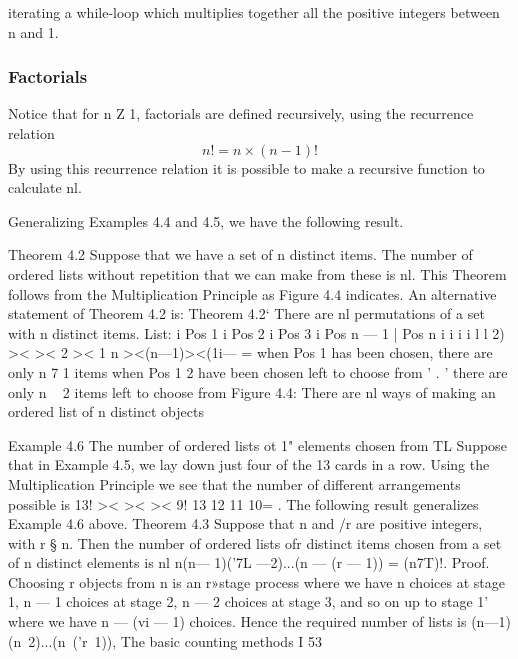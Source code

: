 \documentclass{beamer}
\begin{document}
\begin{frame}
\begin{frame}
iterating a while-loop which multiplies together all the positive
integers between n and 1.

\end{frame}
\begin{frame}
\frametitle{Factorials}
Notice that for n Z 1, factorials are deﬁned recursively, using the
recurrence relation
\[n! = n \times (n-1)! \] 
By using this recurrence relation it is possible to make a recursive
function to calculate nl.

Generalizing Examples 4.4 and 4.5, we have the following result.
\end{frame}
\begin{frame}
Theorem 4.2 Suppose that we have a set of n distinct items. The number
of ordered lists without repetition that we can make from these is nl.
This Theorem follows from the Multiplication Principle as Figure 4.4
indicates. An alternative statement of Theorem 4.2 is:
Theorem 4.2‘ There are nl permutations of a set with n distinct items.
List: i Pos 1 i Pos 2 i Pos 3 i Pos n — 1 | Pos n i
i i i l l
2) >< >< 2 >< 1
n ><(n—1)><(1i— =
when Pos 1 has been chosen,
there are only n 7 1 items when Pos 1 2 have been chosen
left to choose from ’ . ’
there are only n ~ 2 items
left to choose from
Figure 4.4: There are nl ways of making an ordered list of n distinct objects
\end{frame}
\begin{frame}
Example 4.6 The number of ordered lists ot 1" elements chosen from TL
Suppose that in Example 4.5, we lay down just four of the 13 cards
in a row. Using the Multiplication Principle we see that the number
of different arrangements possible is
13!
>< >< >< 9!
13 12 11 10= .
The following result generalizes Example 4.6 above.
Theorem 4.3 Suppose that n and /r are positive integers, with r § n.
Then the number of ordered lists ofr distinct items chosen from a set of
n distinct elements is
nl
n(n— 1)('7L —2)...(n — (r — 1)) = (n7T)!.
Proof. Choosing r objects from n is an r»stage process where we
have n choices at stage 1, n — 1 choices at stage 2, n — 2 choices at
stage 3, and so on up to stage 1' where we have n — (vi — 1) choices.
Hence the required number of lists is
(n—1)(n~2)...(n~('r~1)),
The basic counting methods
I
53




\end{frame}
\end{frame}
\end{document}
